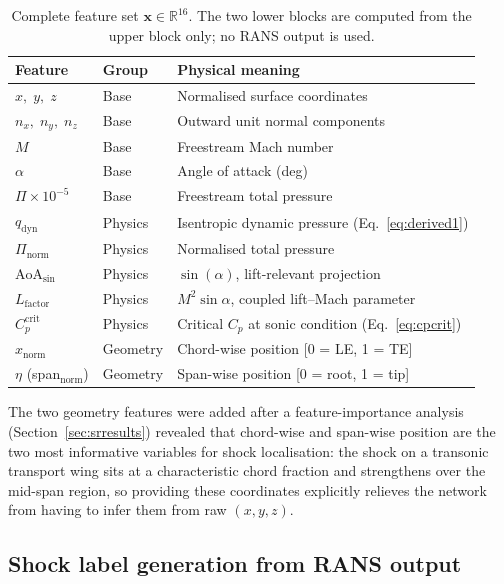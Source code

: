 \documentclass{WCCM-ECCOMAS_2026_Full_Paper}
\begin{document}
\begin{table}[ht]
\centering
\caption{Complete feature set $\mathbf{x}\in\mathbb{R}^{16}$.
  The two lower blocks are computed from the upper block only; no
  RANS output is used.}
\label{tab:features}
\begin{tabular}{lll}
\toprule
\textbf{Feature} & \textbf{Group} & \textbf{Physical meaning} \\
\midrule
$x,\;y,\;z$        & Base & Normalised surface coordinates \\
$n_x,\;n_y,\;n_z$ & Base & Outward unit normal components \\
$M$                & Base & Freestream Mach number \\
$\alpha$           & Base & Angle of attack (deg) \\
$\Pi{\times}10^{-5}$ & Base & Freestream total pressure \\
\midrule
$q_{\mathrm{dyn}}$    & Physics & Isentropic dynamic pressure (Eq.~\ref{eq:derived1}) \\
$\Pi_{\mathrm{norm}}$ & Physics & Normalised total pressure \\
$\mathrm{AoA}_{\sin}$ & Physics & $\sin(\alpha)$, lift-relevant projection \\
$L_{\mathrm{factor}}$ & Physics & $M^{2}\sin\alpha$, coupled lift--Mach parameter \\
$C_{p}^{\mathrm{crit}}$ & Physics & Critical $C_p$ at sonic condition (Eq.~\ref{eq:cpcrit}) \\
\midrule
$x_{\mathrm{norm}}$ & Geometry & Chord-wise position [0 = LE, 1 = TE] \\
$\eta$ (span$_{\mathrm{norm}}$) & Geometry & Span-wise position [0 = root, 1 = tip] \\
\bottomrule
\end{tabular}
\end{table}

The two geometry features were added after a feature-importance
analysis (Section~\ref{sec:srresults}) revealed that chord-wise and
span-wise position are the two most informative variables for shock
localisation: the shock on a transonic transport wing sits at a
characteristic chord fraction and strengthens over the mid-span
region, so providing these coordinates explicitly relieves the
network from having to infer them from raw $(x,y,z)$.

\subsection{Shock label generation from RANS output}
\end{document}
